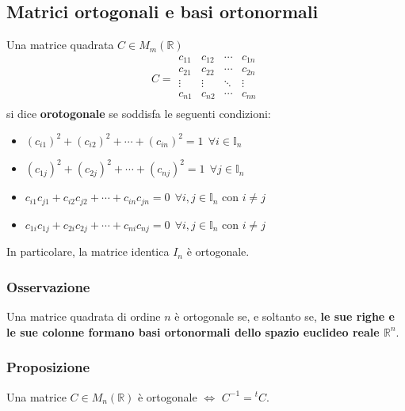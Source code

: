 \documentclass[../main.tex]{subfiles}
\begin{document}
\subsection{Matrici ortogonali e basi ortonormali}
Una matrice quadrata $C\in M_m(\mathbb{R})$
\[
    C = \begin{matrix}
        c_{11} & c_{12} & \cdots & c_{1n} \\
        c_{21} & c_{22} & \cdots & c_{2n} \\
        \vdots & \vdots & \ddots & \vdots \\
        c_{n1} & c_{n2} & \cdots & c_{nn} \\
    \end{matrix}
\]
si dice \textbf{orotogonale} se soddisfa le seguenti condizioni:
\begin{itemize}
    \item $(c_{i1})^2 + (c_{i2})^2 +\cdots + (c_{in})^2 = 1 \ \ \forall i\in \mathbb{I}_n$
    \item $(c_{1j})^2 + (c_{2j})^2 +\cdots + (c_{nj})^2 = 1 \ \ \forall j\in \mathbb{I}_n$
    \item $c_{i1}c_{j1} + c_{i2}c_{j2} +\cdots + c_{in}c_{jn} = 0 \ \ \forall i,j\in \mathbb{I}_n \text{ con } i\ne j$
    \item $c_{1i}c_{1j} + c_{2i}c_{2j} +\cdots + c_{ni}c_{nj} = 0 \ \ \forall i,j\in \mathbb{I}_n \text{ con } i\ne j$
\end{itemize}
In particolare, la matrice identica $I_n$ è ortogonale.

\subsubsection{Osservazione}
Una matrice quadrata di ordine $n$ è ortogonale se, e soltanto se, \textbf{le
    sue righe e le sue colonne formano basi ortonormali dello spazio euclideo reale
    $\mathbb{R}^n$}.

\subsubsection{Proposizione}
Una matrice $C\in M_n(\mathbb{R})$ è ortogonale $\iff$ $C^{-1} = {^{t}C}$.
\end{document}
